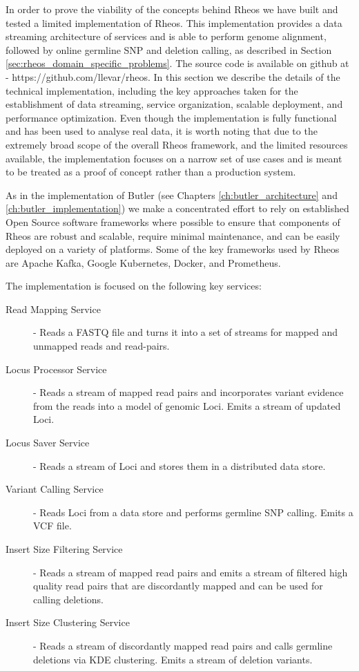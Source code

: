 In order to prove the viability of the concepts behind Rheos we have built and tested a limited implementation of Rheos. This implementation provides a data streaming architecture of services and is able to perform genome alignment, followed by online germline SNP and deletion calling, as described in Section \ref{sec:rheos_domain_specific_problems}. The source code is available on github at - https://github.com/llevar/rheos. In this section we describe the details of the technical implementation, including the key approaches taken for the establishment of data streaming, service organization, scalable deployment, and performance optimization. Even though the implementation is fully functional and has been used to analyse real data, it is worth noting that due to the extremely broad scope of the overall Rheos framework, and the limited resources available, the implementation focuses on a narrow set of use cases and is meant to be treated as a proof of concept rather than a production system.

As in the implementation of Butler (see Chapters \ref{ch:butler_architecture} and \ref{ch:butler_implementation}) we make a concentrated effort to rely on established Open Source software frameworks where possible to ensure that components of Rheos are robust and scalable, require minimal maintenance, and can be easily deployed on a variety of platforms. Some of the key frameworks used by Rheos are Apache Kafka, Google Kubernetes, Docker, and Prometheus.

The implementation is focused on the following key services:

\begin{description}
    \item [Read Mapping Service] - Reads a FASTQ file and turns it into a set of streams for mapped and unmapped reads and read-pairs.
    \item [Locus Processor Service] - Reads a stream of mapped read pairs and incorporates variant evidence from the reads into a model of genomic Loci. Emits a stream of updated Loci.
    \item [Locus Saver Service] - Reads a stream of Loci and stores them in a distributed data store.
    \item [Variant Calling Service] - Reads Loci from a data store and performs germline SNP calling. Emits a VCF file.
    \item [Insert Size Filtering Service] - Reads a stream of mapped read pairs and emits a stream of filtered high quality read pairs that are discordantly mapped and can be used for calling deletions.
    \item [Insert Size Clustering Service] - Reads a stream of discordantly mapped read pairs and calls germline deletions via KDE clustering. Emits a stream of deletion variants.
\end{description}

